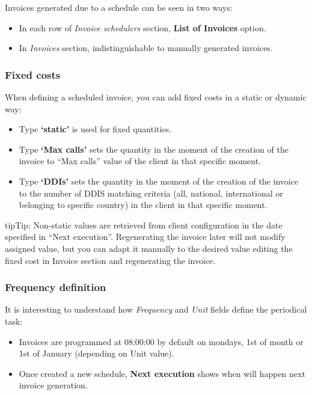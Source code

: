 \documentclass[letterpaper,10pt,english]{sphinxmanual}
\begin{document}
Invoices generated due to a schedule can be seen in two ways:
\begin{itemize}
\item {} 
In each row of \emph{Invoice schedulers} section, \textbf{List of Invoices} option.

\item {} 
In \emph{Invoices} section, indistinguishable to manually generated invoices.

\end{itemize}


\subsubsection{Fixed costs}
\label{administration_portal/brand/invoicing/invoice_schedulers:fixed-costs}
When defining a scheduled invoice, you can add fixed costs in a static or dynamic way:
\begin{itemize}
\item {} 
Type \textbf{`static'} is used for fixed quantities.

\item {} 
Type \textbf{`Max calls'} sets the quantity in the moment of the creation of the invoice to
``Max calls'' value of the client in that specific moment.

\item {} 
Type \textbf{`DDIs'} sets the quantity in the moment of the creation of the invoice to
the number of DDIS matching criteria (all, national, international or belonging to specific country)
in the client in that specific moment.

\end{itemize}

\begin{notice}{tip}{Tip:}
Non-static values are retrieved from client configuration in the date specified in ``Next execution''.
Regenerating the invoice later will not modify assigned value, but you can adapt it manually to
the desired value editing the fixed cost in Invoice section and regenerating the invoice.
\end{notice}


\subsubsection{Frequency definition}
\label{administration_portal/brand/invoicing/invoice_schedulers:frequency-definition}
It is interesting to understand how \emph{Frequency} and \emph{Unit} fields define the periodical task:
\begin{itemize}
\item {} 
Invoices are programmed at 08:00:00 by default on mondays, 1st of month or 1st of January (depending on Unit value).

\item {} 
Once created a new schedule, \textbf{Next execution} shows when will happen next invoice generation.

\end{itemize}
\end{document}
